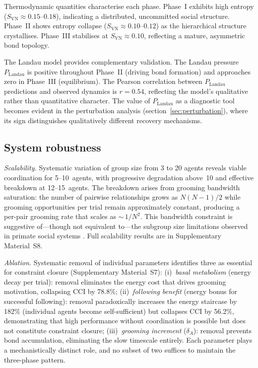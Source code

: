 \documentclass[12pt]{article}
\begin{document}
Thermodynamic quantities characterise each phase. Phase~I exhibits high entropy ($S_\mathrm{VN} \approx 0.15$--$0.18$), indicating a distributed, uncommitted social structure. Phase~II shows entropy collapse ($S_\mathrm{VN} \approx 0.10$--$0.12$) as the hierarchical structure crystallises. Phase~III stabilises at $S_\mathrm{VN} \approx 0.10$, reflecting a mature, asymmetric bond topology.

The Landau model provides complementary validation. The Landau pressure $P_\mathrm{Landau}$ is positive throughout Phase~II (driving bond formation) and approaches zero in Phase~III (equilibrium). The Pearson correlation between $P_\mathrm{Landau}$ predictions and observed dynamics is $r = 0.54$, reflecting the model's qualitative rather than quantitative character. The value of $P_\mathrm{Landau}$ as a diagnostic tool becomes evident in the perturbation analysis (section~\ref{sec:perturbation}), where its sign distinguishes qualitatively different recovery mechanisms.


\subsection{System robustness}
\label{sec:robustness}

\emph{Scalability.} Systematic variation of group size from 3 to 20 agents reveals viable coordination for 5--10~agents, with progressive degradation above~10 and effective breakdown at 12--15~agents. The breakdown arises from grooming bandwidth saturation: the number of pairwise relationships grows as $N(N-1)/2$ while grooming opportunities per trial remain approximately constant, producing a per-pair grooming rate that scales as ${\sim}\,1/N^2$. This bandwidth constraint is suggestive of---though not equivalent to---the subgroup size limitations observed in primate social systems \cite{dunbar1992}. Full scalability results are in Supplementary Material~S8.

\emph{Ablation.} Systematic removal of individual parameters identifies three as essential for constraint closure (Supplementary Material~S7): (i)~\emph{basal metabolism} (energy decay per trial): removal eliminates the energy cost that drives grooming motivation, collapsing CCI by 78.8\%; (ii)~\emph{following benefit} (energy bonus for successful following): removal paradoxically increases the energy staircase by 182\% (individual agents become self-sufficient) but collapses CCI by 56.2\%, demonstrating that high performance without coordination is possible but does not constitute constraint closure; (iii)~\emph{grooming increment} ($\delta_A$): removal prevents bond accumulation, eliminating the slow timescale entirely. Each parameter plays a mechanistically distinct role, and no subset of two suffices to maintain the three-phase pattern.
\end{document}
